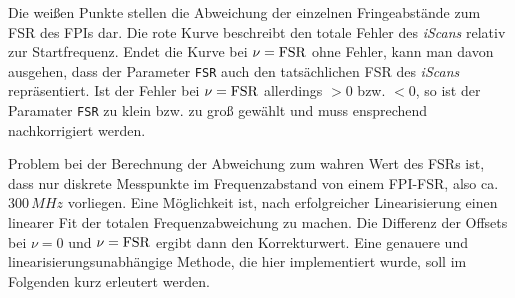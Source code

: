 Die weißen Punkte stellen die Abweichung der einzelnen Fringeabstände zum FSR
des FPIs dar. Die rote Kurve beschreibt den totale Fehler des \textit{iScans} relativ zur
Startfrequenz. Endet die Kurve bei $\nu=\text{\lstinline|FSR|}$ ohne Fehler,
kann man davon ausgehen, dass der Parameter \lstinline|FSR| auch den
tatsächlichen FSR des \textit{iScans} repräsentiert. Ist der Fehler bei
$\nu=\text{\lstinline|FSR|}$ allerdings $>0$ bzw. $<0$, so ist
der Paramater \lstinline|FSR| zu klein bzw. zu groß gewählt und muss ensprechend
nachkorrigiert werden.\par
Problem bei der Berechnung der Abweichung zum wahren Wert des FSRs ist, dass nur
diskrete Messpunkte im Frequenzabstand von einem FPI-FSR, also ca. $300\,MHz$
vorliegen. Eine Möglichkeit ist, nach erfolgreicher Linearisierung einen
linearer Fit der totalen Frequenzabweichung zu machen. Die Differenz der Offsets bei
$\nu=0$ und $\nu=\text{\lstinline|FSR|}$ ergibt dann den Korrekturwert. Eine
genauere und linearisierungsunabhängige Methode, die hier implementiert wurde,
soll im Folgenden kurz erleutert werden.\par

